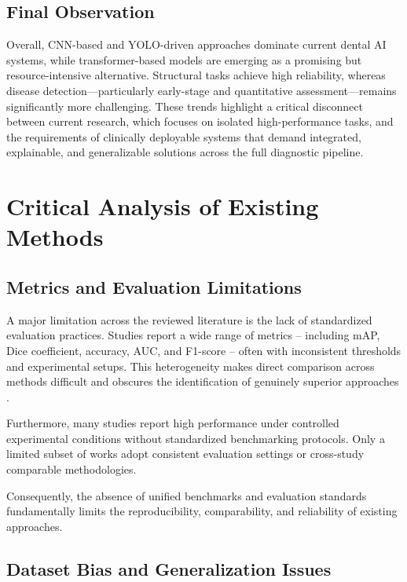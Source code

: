 \documentclass[conference]{IEEEtran}
\begin{document}
\subsection{Final Observation}

Overall, CNN-based and YOLO-driven approaches dominate current dental AI systems, while transformer-based models are emerging as a promising but resource-intensive alternative. Structural tasks achieve high reliability, whereas disease detection—particularly early-stage and quantitative assessment—remains significantly more challenging. These trends highlight a critical disconnect between current research, which focuses on isolated high-performance tasks, and the requirements of clinically deployable systems that demand integrated, explainable, and generalizable solutions across the full diagnostic pipeline.

\section{Critical Analysis of Existing Methods}
\label{sec:critical}

\subsection{Metrics and Evaluation Limitations}

A major limitation across the reviewed literature is the lack of
standardized evaluation practices. Studies report a wide range of
metrics -- including mAP, Dice coefficient, accuracy, AUC, and
F1-score -- often with inconsistent thresholds and experimental setups.
This heterogeneity makes direct comparison across methods difficult and
obscures the identification of genuinely superior approaches
\cite{iacob2025automated,bonfanti2025deep,khubrani2025detection}.

Furthermore, many studies report high performance under controlled
experimental conditions without standardized benchmarking protocols.
Only a limited subset of works adopt consistent evaluation settings or
cross-study comparable methodologies.

Consequently, the absence of unified benchmarks and evaluation standards
fundamentally limits the reproducibility, comparability, and reliability
of existing approaches.

\subsection{Dataset Bias and Generalization Issues}
\end{document}
